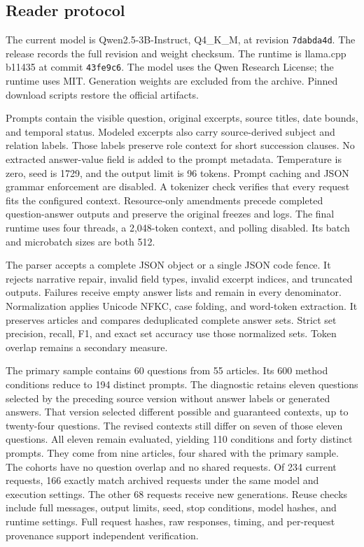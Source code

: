 \subsection{Reader protocol}
\label{app:reader}
The current model is Qwen2.5-3B-Instruct, Q4\_K\_M, at revision \texttt{7dabda4d}.
The release records the full revision and weight checksum.
The runtime is llama.cpp b11435 at commit \texttt{43fe9c6}.
The model uses the Qwen Research License; the runtime uses MIT.
Generation weights are excluded from the archive.
Pinned download scripts restore the official artifacts.

Prompts contain the visible question, original excerpts, source titles, date bounds, and temporal status.
Modeled excerpts also carry source-derived subject and relation labels.
Those labels preserve role context for short succession clauses.
No extracted answer-value field is added to the prompt metadata.
Temperature is zero, seed is 1729, and the output limit is 96 tokens.
Prompt caching and JSON grammar enforcement are disabled.
A tokenizer check verifies that every request fits the configured context.
Resource-only amendments precede completed question-answer outputs and preserve the original freezes and logs.
The final runtime uses four threads, a 2,048-token context, and polling disabled.
Its batch and microbatch sizes are both 512.

The parser accepts a complete JSON object or a single JSON code fence.
It rejects narrative repair, invalid field types, invalid excerpt indices, and truncated outputs.
Failures receive empty answer lists and remain in every denominator.
Normalization applies Unicode NFKC, case folding, and word-token extraction.
It preserves articles and compares deduplicated complete answer sets.
Strict set precision, recall, F1, and exact set accuracy use those normalized sets.
Token overlap remains a secondary measure.

The primary sample contains 60 questions from 55 articles.
Its 600 method conditions reduce to 194 distinct prompts.
The diagnostic retains eleven questions selected by the preceding source version without answer labels or generated answers.
That version selected different possible and guaranteed contexts, up to twenty-four questions.
The revised contexts still differ on seven of those eleven questions.
All eleven remain evaluated, yielding 110 conditions and forty distinct prompts.
They come from nine articles, four shared with the primary sample.
The cohorts have no question overlap and no shared requests.
Of 234 current requests, 166 exactly match archived requests under the same model and execution settings.
The other 68 requests receive new generations.
Reuse checks include full messages, output limits, seed, stop conditions, model hashes, and runtime settings.
Full request hashes, raw responses, timing, and per-request provenance support independent verification.


